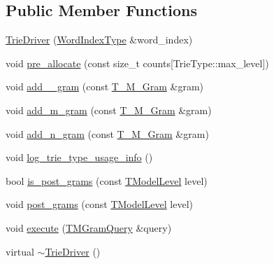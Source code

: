 \subsection*{Public Member Functions}
\begin{DoxyCompactItemize}
\item 
\hyperlink{classuva_1_1smt_1_1tries_1_1_trie_driver_a93da8fa1574f630c7f6b41e12c5be9f1}{Trie\+Driver} (\hyperlink{classuva_1_1smt_1_1tries_1_1_trie_driver_a023b5239f73b471b9e8b60dec540c0df}{Word\+Index\+Type} \&word\+\_\+index)
\item 
void \hyperlink{classuva_1_1smt_1_1tries_1_1_trie_driver_a12098030b21801aecc06ac0a9710a750}{pre\+\_\+allocate} (const size\+\_\+t counts\mbox{[}Trie\+Type\+::max\+\_\+level\mbox{]})
\item 
void \hyperlink{classuva_1_1smt_1_1tries_1_1_trie_driver_a31428d84bd26b377de0806d07e28b886}{add\+\_\+\_\+gram} (const \hyperlink{structuva_1_1smt_1_1tries_1_1mgrams_1_1_t___m___gram}{T\+\_\+\+M\+\_\+\+Gram} \&gram)
\item 
void \hyperlink{classuva_1_1smt_1_1tries_1_1_trie_driver_a8a929763ada9a1d69be630c19af53b3e}{add\+\_\+m\+\_\+gram} (const \hyperlink{structuva_1_1smt_1_1tries_1_1mgrams_1_1_t___m___gram}{T\+\_\+\+M\+\_\+\+Gram} \&gram)
\item 
void \hyperlink{classuva_1_1smt_1_1tries_1_1_trie_driver_ab40a3aede781d63ccdd3e1711fe23819}{add\+\_\+n\+\_\+gram} (const \hyperlink{structuva_1_1smt_1_1tries_1_1mgrams_1_1_t___m___gram}{T\+\_\+\+M\+\_\+\+Gram} \&gram)
\item 
void \hyperlink{classuva_1_1smt_1_1tries_1_1_trie_driver_ad40c064d52e989e67f2605391711bb1b}{log\+\_\+trie\+\_\+type\+\_\+usage\+\_\+info} ()
\item 
bool \hyperlink{classuva_1_1smt_1_1tries_1_1_trie_driver_a7dff6d94e0f7d5200076f379639dd097}{is\+\_\+post\+\_\+grams} (const \hyperlink{namespaceuva_1_1smt_1_1tries_a20577a44b3a42d26524250634379b7cb}{T\+Model\+Level} level)
\item 
void \hyperlink{classuva_1_1smt_1_1tries_1_1_trie_driver_a40148287951d8d72913155842203d566}{post\+\_\+grams} (const \hyperlink{namespaceuva_1_1smt_1_1tries_a20577a44b3a42d26524250634379b7cb}{T\+Model\+Level} level)
\item 
void \hyperlink{classuva_1_1smt_1_1tries_1_1_trie_driver_a62465f5be76be6534be7e4c147fc5013}{execute} (\hyperlink{classuva_1_1smt_1_1tries_1_1_trie_driver_ab7b70ba376d851025035ca71ebe54725}{T\+M\+Gram\+Query} \&query)
\item 
virtual \hyperlink{classuva_1_1smt_1_1tries_1_1_trie_driver_adb5f8af21e113e1d6f1ecabcf5b94251}{$\sim$\+Trie\+Driver} ()
\end{DoxyCompactItemize}
